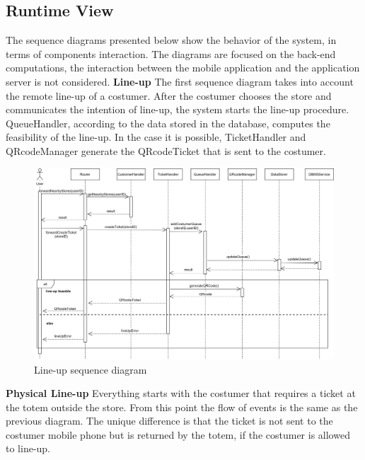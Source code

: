 \documentclass[]{article}
\begin{document}
	\subsection{Runtime View}
	The sequence diagrams presented below show the behavior of the system, in terms of components interaction. The diagrams are focused on the back-end computations, the interaction between the mobile application and the application server is not considered.
	\newline
	\newline
	\noindent
	\textbf{Line-up}
	\newline \newline
	The first sequence diagram takes into account the remote line-up of a costumer.
	After the costumer chooses the store and communicates the intention of line-up, the system starts the line-up procedure. QueueHandler, according to the data stored in the database, computes the feasibility of the line-up. In the case it is possible, TicketHandler and QRcodeManager generate the QRcodeTicket that is sent to the costumer.
	\bigskip
	\bigskip
	
	\begin{figure}[H]
		\centering
		\includegraphics[scale=0.6]{lineupSequence}
		\caption{Line-up sequence diagram}
	\end{figure}
	
	\newpage
	\noindent
	\textbf{Physical Line-up}
	\newline \newline
	Everything starts with the costumer that requires a ticket at the totem outside the store. From this point the flow of events is the same as the previous diagram. The unique difference is that the ticket is not sent to the costumer mobile phone but is returned by the totem, if the costumer is allowed to line-up.
	\bigskip
	
\end{document}
